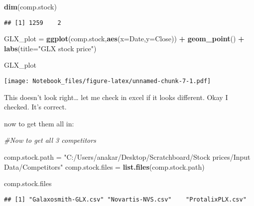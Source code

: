 \documentclass[
]{article}
\newenvironment{Shaded}{\begin{snugshade}}{\end{snugshade}}
\newcommand{\CommentTok}[1]{\textcolor[rgb]{0.56,0.35,0.01}{\textit{#1}}}
\newcommand{\DataTypeTok}[1]{\textcolor[rgb]{0.13,0.29,0.53}{#1}}
\newcommand{\KeywordTok}[1]{\textcolor[rgb]{0.13,0.29,0.53}{\textbf{#1}}}
\newcommand{\NormalTok}[1]{#1}
\newcommand{\OperatorTok}[1]{\textcolor[rgb]{0.81,0.36,0.00}{\textbf{#1}}}
\newcommand{\StringTok}[1]{\textcolor[rgb]{0.31,0.60,0.02}{#1}}
\begin{document}
\begin{Shaded}
\begin{Highlighting}[]
\KeywordTok{dim}\NormalTok{(comp.stock)}
\end{Highlighting}
\end{Shaded}

\begin{verbatim}
## [1] 1259    2
\end{verbatim}

\begin{Shaded}
\begin{Highlighting}[]
\NormalTok{GLX_plot =}\StringTok{ }\KeywordTok{ggplot}\NormalTok{(comp.stock,}\KeywordTok{aes}\NormalTok{(}\DataTypeTok{x=}\NormalTok{Date,}\DataTypeTok{y=}\NormalTok{Close)) }\OperatorTok{+}\StringTok{ }\KeywordTok{geom_point}\NormalTok{() }\OperatorTok{+}\StringTok{ }\KeywordTok{labs}\NormalTok{(}\DataTypeTok{title=}\StringTok{"GLX stock price"}\NormalTok{)}

\NormalTok{GLX_plot}
\end{Highlighting}
\end{Shaded}

\texttt{[image: Notebook\_files/figure-latex/unnamed-chunk-7-1.pdf]}

This doesn't look right\ldots{} let me check in excel if it looks
different. Okay I checked. It's correct.

now to get them all in:

\begin{Shaded}
\begin{Highlighting}[]
\CommentTok{#Now to get all 3 competitors}

\NormalTok{comp.stock.path =}\StringTok{ "C:/Users/anakar/Desktop/Scratchboard/Stock prices/Input Data/Competitors"}
\NormalTok{comp.stock.files =}\StringTok{ }\KeywordTok{list.files}\NormalTok{(comp.stock.path)}

\NormalTok{comp.stock.files}
\end{Highlighting}
\end{Shaded}

\begin{verbatim}
## [1] "Galaxosmith-GLX.csv" "Novartis-NVS.csv"    "ProtalixPLX.csv"
\end{verbatim}

\begin{Shaded}
\end{Shaded}
\end{document}
